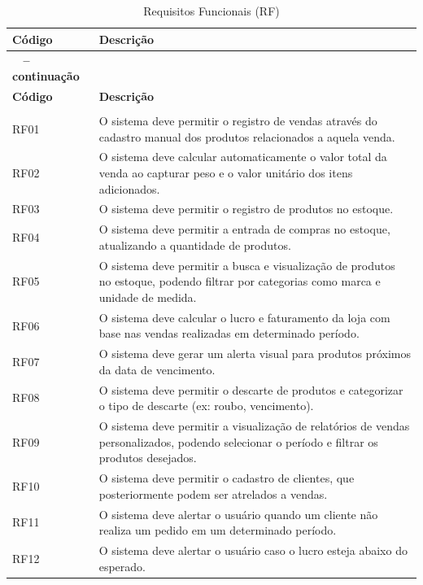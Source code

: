 \documentclass[
	12pt,				%
	openany,			%
	oneside,			%
	a4paper,			%
	english,			%
	french,				%
	spanish,			%
	brazil				%
	]{abntex2}
\begin{document}
\begin{longtable}{|>{\centering\arraybackslash}m{1.5cm}|>{\raggedright\arraybackslash}m{13cm}|}
    \caption{Requisitos Funcionais (RF)}
    \label{tab:requisitos_funcionais}\\
    \hline
    \textbf{Código} & \textbf{Descrição} \\ 
    \hline
    \endfirsthead

    \multicolumn{2}{c}%
    {{\bfseries \tablename\ \thetable{} -- continuação}} \\
    \hline
    \textbf{Código} & \textbf{Descrição} \\ 
    \hline
    \endhead
    \hline
    \multicolumn{2}{|r|}{{Continua...}} \\
    \hline
    \endfoot
    \hline
    \endlastfoot

    RF01 & O sistema deve permitir o registro de vendas através do cadastro manual dos produtos relacionados a aquela venda. \\ 
    \hline
    RF02 & O sistema deve calcular automaticamente o valor total da venda ao capturar peso e o valor unitário dos itens adicionados. \\ 
    \hline
    RF03 & O sistema deve permitir o registro de produtos no estoque. \\ 
    \hline
    RF04 & O sistema deve permitir a entrada de compras no estoque, atualizando a quantidade de produtos. \\ 
    \hline
    RF05 & O sistema deve permitir a busca e visualização de produtos no estoque, podendo filtrar por categorias como marca e unidade de medida. \\ 
    \hline
    RF06 & O sistema deve calcular o lucro e faturamento da loja com base nas vendas realizadas em determinado período. \\ 
    \hline
    RF07 & O sistema deve gerar um alerta visual para produtos próximos da data de vencimento. \\ 
    \hline
    RF08 & O sistema deve permitir o descarte de produtos e categorizar o tipo de descarte (ex: roubo, vencimento). \\ 
    \hline
    RF09 & O sistema deve permitir a visualização de relatórios de vendas personalizados, podendo selecionar o período e filtrar os produtos desejados. \\ 
    \hline
    RF10 & O sistema deve permitir o cadastro de clientes, que posteriormente podem ser atrelados a vendas. \\ 
    \hline
    RF11 & O sistema deve alertar o usuário quando um cliente não realiza um pedido em um determinado período. \\ 
    \hline
    RF12 & O sistema deve alertar o usuário caso o lucro esteja abaixo do esperado. \\ 
    \hline
\end{longtable}
\end{document}
